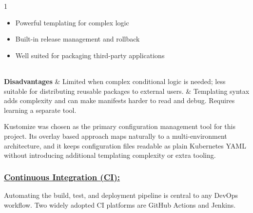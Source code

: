 \begin{table}[H]
\begin{tabularx}{1\textwidth}
\begin{itemize}[leftmargin=*, topsep=0pt, itemsep=1pt, parsep=2pt]
            \item Powerful templating for complex logic
            \item Built-in release management and rollback
            \item Well suited for packaging third-party applications
        \end{itemize}                                                \\
        \hline
        \textbf {Disadvantages}             & \noindent Limited when complex conditional logic is needed; less suitable for distributing reusable packages to external users.                                                                                                                                                                                                        & \noindent Templating syntax adds complexity and can make manifests harder to read and debug. Requires learning a separate tool. \\
        \hline
    \end{tabularx}
\end{table}
Kustomize was chosen as the primary configuration management tool for this 
project. Its overlay based approach maps naturally to a multi-environment 
architecture, and it keeps configuration files readable as plain Kubernetes 
YAML without introducing additional templating complexity or extra tooling.

\subsubsection*{\underline{Continuous Integration (CI):}}
Automating the build, test, and deployment \cite{docker} pipeline is central to any DevOps workﬂow.
Two widely adopted CI platforms are GitHub Actions and Jenkins.


